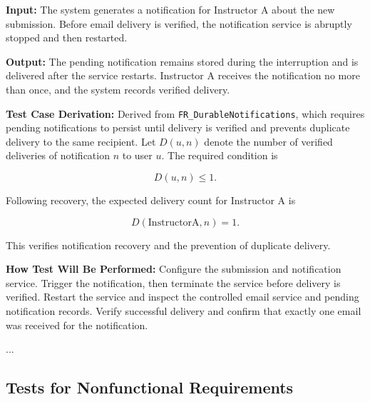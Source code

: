 \documentclass[12pt, titlepage]{article}
\begin{document}
\begin{enumerate}
\textbf{Input:} The system generates a notification for Instructor A about the new submission. Before email delivery is verified, the notification service is abruptly stopped and then restarted.

\textbf{Output:} The pending notification remains stored during the interruption and is delivered after the service restarts. Instructor A receives the notification no more than once, and the system records verified delivery.

\textbf{Test Case Derivation:} Derived from \texttt{FR\_DurableNotifications}, which requires pending notifications to persist until delivery is verified and prevents duplicate delivery to the same recipient. Let $D(u,n)$ denote the number of verified deliveries of notification $n$ to user $u$. The required condition is

\[
D(u,n)\leq 1.
\]

Following recovery, the expected delivery count for Instructor A is

\[
D(\mathrm{InstructorA},n)=1.
\]

This verifies notification recovery and the prevention of duplicate delivery.

\textbf{How Test Will Be Performed:} Configure the submission and notification service. Trigger the notification, then terminate the service before delivery is verified. Restart the service and inspect the controlled email service and pending notification records. Verify successful delivery and confirm that exactly one email was received for the notification.

\end{enumerate}

...

\subsection{Tests for Nonfunctional Requirements}


\end{document}
